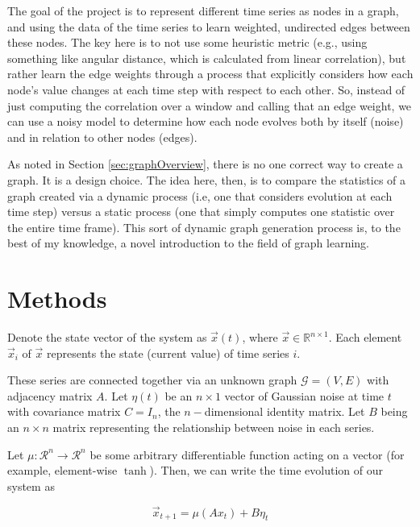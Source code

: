 \documentclass{article}
\theoremstyle{definition}
\begin{document}
The goal of the project is to represent different time series as nodes in a graph, and using the data of the time series to learn weighted, undirected edges between these nodes. The key here is to not use some heuristic metric (e.g., using something like angular distance, which is calculated from linear correlation), but rather learn the edge weights through a process that explicitly considers how each node's value changes at each time step with respect to each other. So, instead of just computing the correlation over a window and calling that an edge weight, we can use a noisy model to determine how each node evolves both by itself (noise) and in relation to other nodes (edges).

As noted in Section \ref{sec:graphOverview}, there is no one correct way to create a graph. It is a design choice. The idea here, then, is to compare the statistics of a graph created via a dynamic process (i.e, one that considers evolution at each time step) versus a static process (one that simply computes one statistic over the entire time frame). This sort of dynamic graph generation process is, to the best of my knowledge, a novel introduction to the field of graph learning.

\section{Methods}
\label{sec:methods}

Denote the state vector of the system as $\Vec{x}(t)$, where $\Vec{x} \in \mathbb{R}^{n \times 1}$. Each element $\Vec{x}_i$ of $\Vec{x}$ represents the state (current value) of time series $i$. 

These series are connected together via an unknown graph $\mathcal{G} = (V, E)$ with adjacency matrix $A$. Let $\eta(t)$ be an $n \times 1$ vector of Gaussian noise at time $t$ with covariance matrix $C = I_n$, the $n-$dimensional identity matrix. Let $B$ being an $n \times n$ matrix representing the relationship between noise in each series. 

Let $\mu: \mathcal{R}^n \longrightarrow \mathcal{R}^n$ be some arbitrary differentiable function acting on a vector (for example, element-wise $\tanh$). Then, we can write the time evolution of our system as

\begin{equation}
    \label{eqn:stateEvolution}
    \Vec{x}_{t+1} = \mu(Ax_t) + B\eta_t
\end{equation}

\end{document}
